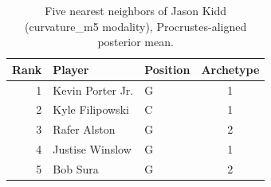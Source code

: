 \begin{table}[htbp]
  \centering\small
  \begin{tabular}{rllc}
    \toprule
    Rank & Player & Position & Archetype \\
    \midrule
    1 & Kevin Porter Jr. & G & 1 \\
    2 & Kyle Filipowski & C & 1 \\
    3 & Rafer Alston & G & 2 \\
    4 & Justise Winslow & G & 1 \\
    5 & Bob Sura & G & 2 \\
    \bottomrule
  \end{tabular}
  \caption{Five nearest neighbors of Jason Kidd (curvature_m5 modality), Procrustes-aligned posterior mean.}
  \label{tab:Jason_Kidd_neighbors_curvature_m5}
\end{table}

